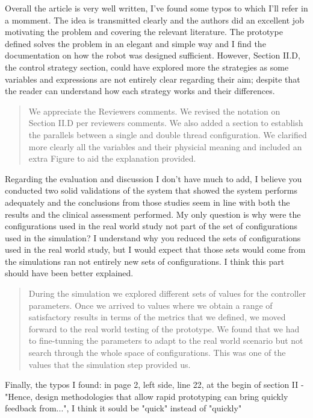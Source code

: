 \documentclass[journal,onecolumn,12pt]{IEEEtran}
\begin{document}
Overall the article is very well written, I've found some typos to which I'll refer in a momment. The idea is transmitted clearly and the authors did an excellent job motivating the problem and covering the relevant literature. The prototype defined solves the problem in an elegant and simple way and I find the documentation on how the robot was designed sufficient. However, Section II.D, the control strategy section, could have explored more the strategies as some variables and expressions are not entirely clear regarding their aim; despite that the reader can understand how each strategy works and their differences.

\begin{quotation}
{\color{blue}
We appreciate the Reviewers comments.  We revised the notation on Section II.D per reviewers comments.  We also added a section to establish the parallels between a single and double thread configuration.  We clarified more clearly all the variables and their physicial meaning and included an extra Figure to aid the explanation provided.
}
\end{quotation}


Regarding the evaluation and discussion I don't have much to add, I believe you conducted two solid validations of the system that showed the system performs adequately and the conclusions from those studies seem in line with both the results and the clinical assessment performed. My only question is why were the configurations used in the real world study not part of the set of configurations used in the simulation? I understand why you reduced the sets of configurations used in the real world study, but I would expect that those sets would come from the simulations ran not entirely new sets of configurations. I think this part should have been better explained.

\begin{quotation}
{\color{blue}
During the simulation we explored different sets of values for the controller parameters.  Once we arrived to values where we obtain a range of satisfactory results in terms of the metrics that we defined, we moved forward to the real world testing of the prototype.  We found that we had to fine-tunning the parameters to adapt to the real world scenario but not search through the whole space of configurations.  This was one of the values that the simulation step provided us.
}
\end{quotation}


Finally, the typos I found:
      in page 2, left side, line 22, at the begin of section II - "Hence, design methodologies that allow rapid prototyping can bring quickly feedback from...", I think it sould be "quick" instead of "quickly"
      
\end{document}
